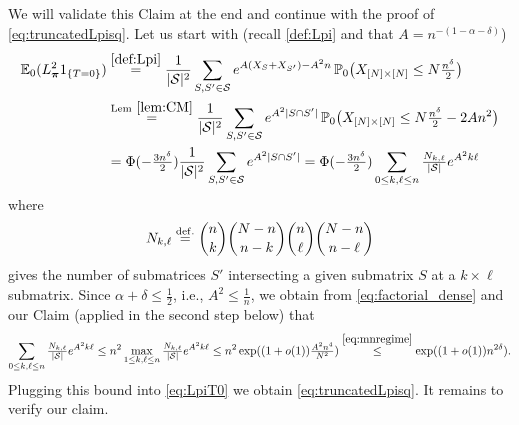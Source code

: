 \documentclass[11pt,reqno,letterpaper]{amsart}
\numberwithin{equation}{section}
\theoremstyle{plain}
\def \bpi{\boldsymbol{\pi}}
\def \E{\mathbb{E}}
\def \P{\mathbb{P}}
\begin{document}
We will validate this Claim at the end and continue with the proof of 
\eqref{eq:truncatedLpisq}. Let us start with (recall \eqref{def:Lpi} and that $A = n^{-(1 - \alpha - \delta)}$)
\begin{equation}\label{eq:LpiT0}
\begin{split}
 \E_0(L_{\bpi}^21_{\{T = 0\}}) &\stackrel{\eqref{def:Lpi}}{=} \frac 1{|\mathcal S|^2} \sum_{S, S' \in \mathcal S}e^{A(X_S + X_{S'}) - A^2n} \, \P_0 \big( X_{[N] \times [N]} \le  N \tfrac{n^\delta}2 \big)\\
 &\stackrel{{\rm Lem}~\ref{lem:CM}}{=} \frac 1{|\mathcal S|^2} \sum_{S, S' \in \mathcal S} e^{A^2|S \cap S'|} \, \P_0 \big( X_{[N] \times [N]} \le  N \tfrac{n^\delta}2 - 2An^2 \big)\\ 
 &= \Phi(-\tfrac{3n^{\delta}}2) \frac 1{|\mathcal S|^2} \sum_{S, S' \in \mathcal S} e^{A^2|S \cap S'|} = \Phi(-\tfrac{3n^{\delta}}2) \sum_{0 \le k, \ell \le n} \tfrac{N_{k, \ell}}{|\mathcal S|} e^{A^2k \ell}
\end{split}
\end{equation}
where 
\begin{equation}\label{def:Nkl}
N_{k, \ell} %
\stackrel{{\rm def.}}{=} {n \choose k} {N - n \choose n - k} %
{n \choose \ell}{N - n \choose n - \ell}
\end{equation}
gives the number of submatrices $S'$ intersecting a given submatrix $S$ at a $k \times \ell$ submatrix. %
Since $\alpha + \delta \le \frac 12$, i.e., $A^2 \le \frac1n$, we obtain from 
\eqref{eq:factorial_dense} and our Claim (applied in the second step below) that
\begin{equation*}
\sum_{0 \le k, \ell \le n} \tfrac{N_{k, \ell}}{|\mathcal S|} e^{A^2k \ell} \le n^2 \max_{1 \le k, \ell \le n} \tfrac{N_{k, \ell}}{|\mathcal S|} e^{A^2k \ell} 
\le n^2 %
\exp((1 + o(1))\tfrac{A^2n^4}{N^2}) \stackrel{\eqref{eq:mnregime}}{\le} \exp((1 + o(1))n^{2\delta}).
\end{equation*}
Plugging this bound into \eqref{eq:LpiT0} we obtain \eqref{eq:truncatedLpisq}. It 
remains to verify our claim.

\vspace{0.1cm}
\end{document}
